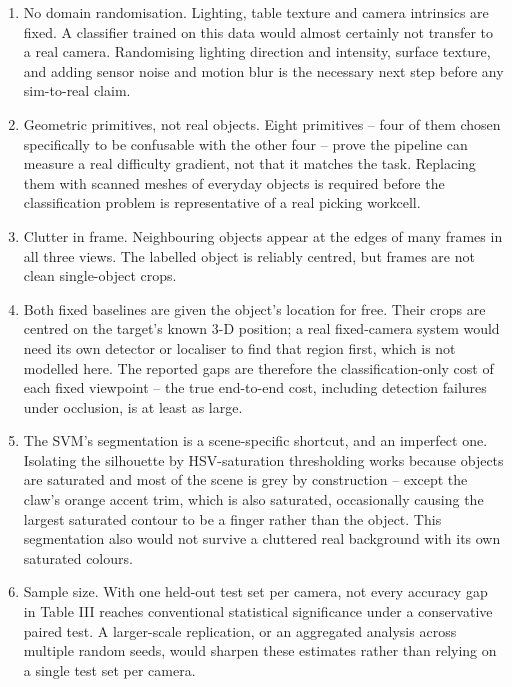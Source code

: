 \documentclass[conference]{IEEEtran}
\begin{document}
\begin{enumerate}

  \item No domain randomisation. Lighting, table texture and camera intrinsics are fixed. A classifier trained on this data would almost certainly not transfer to a real camera. Randomising lighting direction and intensity, surface texture, and adding sensor noise and motion blur is the necessary next step before any sim-to-real claim.

  \item Geometric primitives, not real objects. Eight primitives -- four of them chosen specifically to be confusable with the other four -- prove the pipeline can measure a real difficulty gradient, not that it matches the task. Replacing them with scanned meshes of everyday objects is required before the classification problem is representative of a real picking workcell.

  \item Clutter in frame. Neighbouring objects appear at the edges of many frames in all three views. The labelled object is reliably centred, but frames are not clean single-object crops.

  \item Both fixed baselines are given the object's location for free. Their crops are centred on the target's known 3-D position; a real fixed-camera system would need its own detector or localiser to find that region first, which is not modelled here. The reported gaps are therefore the classification-only cost of each fixed viewpoint -- the true end-to-end cost, including detection failures under occlusion, is at least as large.

  \item The SVM's segmentation is a scene-specific shortcut, and an imperfect one. Isolating the silhouette by HSV-saturation thresholding works because objects are saturated and most of the scene is grey by construction -- except the claw's orange accent trim, which is also saturated, occasionally causing the largest saturated contour to be a finger rather than the object. This segmentation also would not survive a cluttered real background with its own saturated colours.

  \item Sample size. With one held-out test set per camera, not every accuracy gap in Table III reaches conventional statistical significance under a conservative paired test. A larger-scale replication, or an aggregated analysis across multiple random seeds, would sharpen these estimates rather than relying on a single test set per camera.


\end{enumerate}
\end{document}
